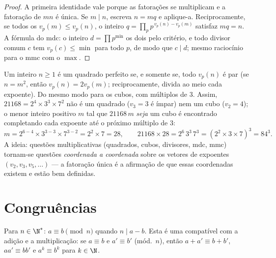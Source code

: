 \begin{proof}
A primeira identidade vale porque as fatorações se multiplicam e a
fatoração de $mn$ é única. Se $m \mid n$, escreva $n = mq$ e
aplique-a. Reciprocamente, se todos os $v_p(m) \leq v_p(n)$, o inteiro $q =
\prod_p p^{\,v_p(n) - v_p(m)}$ satisfaz $mq = n$. A fórmula do mdc:
o inteiro $d = \prod p^{\min}$  os dois pelo critério, e
todo divisor comum $c$ tem $v_p(c) \leq \min$ para todo $p$, de modo que $c
\mid d$; mesmo raciocínio para o mmc com o $\max$.
\end{proof}

\begin{example}\label{ex:b1:arith:squarecube}
Um inteiro $n \geq 1$ é um quadrado perfeito se, e somente se, todo
$v_p(n)$ é par (se $n = m^2$, então $v_p(n) = 2v_p(m)$;
reciprocamente, divida ao meio cada expoente). Do mesmo modo para os
cubos, com múltiplos de $3$. Assim, $21168 = 2^4 \times 3^3 \times 7^2$ não é
um quadrado ($v_3 = 3$ é ímpar) nem um cubo ($v_2 = 4$); o
menor inteiro positivo $m$ tal que $21168\,m$ \emph{seja} um
cubo é encontrado completando cada expoente até o próximo múltiplo de
$3$:
\[
m = 2^{6-4} \times 3^{3-3} \times 7^{3-2} = 2^2 \times 7 = 28,
\qquad
21168 \times 28 = 2^6\,3^3\,7^3 = (2^2 \times 3 \times 7)^3
= 84^3 .
\]
A ideia: questões multiplicativas (quadrados, cubos, divisores,
mdc, mmc) tornam-se questões \emph{coordenada a coordenada} sobre os
vetores de expoentes $(v_2, v_3, v_5, \dots)$ --- a fatoração única é a
afirmação de que essas coordenadas existem e estão bem definidas.
\end{example}

\section{Congruências}

\begin{definition}\label{def:b1:arith:congruence}
Para $n \in \N^*$: $a \equiv b \pmod n$ quando $n \mid
a - b$. Esta é uma  compatível com a adição e
a multiplicação: se $a \equiv b$ e $a' \equiv b'$ (mód.\ $n$), então
$a + a' \equiv b + b'$, $aa' \equiv bb'$ e $a^k \equiv b^k$ para
$k \in \N$.
\end{definition}

